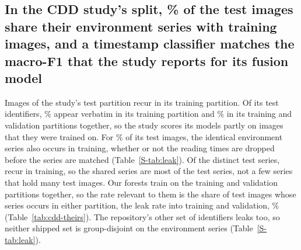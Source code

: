 \documentclass[preprint,12pt,authoryear,nopreprintline]{elsarticle}
\begin{document}
\subsection{In the CDD study's split, \cddLeak{}\% of the test images share their
environment series with training images, and a timestamp classifier matches the
macro-F1 that the study reports for its fusion model}
\label{sec:res-cdd}

Images of the study's test partition recur in its training partition. Of its test
identifiers,
\cddDirectTest{}\% appear verbatim in its training partition and
\cddDirectTrainval{}\% in its training and validation partitions together, so the
study scores its models partly on images that they were trained on. For
\cddLeak{}\% of its test images, the identical environment series also occurs in
training, whether or not the reading times are dropped before the series are matched
(Table~\ref{S-tab:leak}). Of the \cddGroupsTotal{} distinct test series, \cddGroupsShared{} recur in
training, so the shared series are most of the test series, not a few series that
hold many test images. Our forests train on the training and validation partitions together, so the rate
relevant to them is the share of test images whose series occurs in either partition,
the leak rate into training and validation, \cddLeakTrainval{}\% (Table~\ref{tab:cdd-theirs}). The repository's other set of identifiers leaks too, so
neither shipped set is group-disjoint on the environment series (Table~\ref{S-tab:leak}).
\end{document}
